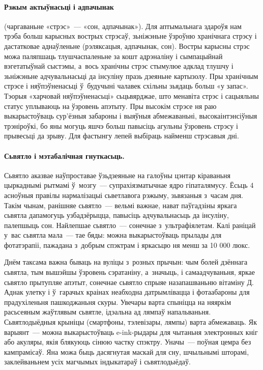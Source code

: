 \paragraph{Рэжым актыўнасьці і адпачынак} (чаргаваньне «стрэс»~--- «сон, адпачынак»).
Для аптымальнага здароўя нам трэба больш карысных вострых стрэсаў, зьніжэньне ўзроўню хранічнага стрэсу і дастатковае аднаўленьне (рэляксацыя, адпачынак, сон). Востры карысны стрэс можа паляпшаць тлушчаспаленьне за кошт адрэналіну і сымпацыйнай вэгетатыўнай сыстэмы, а~вось хранічны стрэс стымулюе адклад тлушчу і зьніжэньне адчувальнасьці да інсуліну празь дзеяньне картызолу. Пры хранічным стрэсе і няўпэўненасьці ў~будучыні чалавек схільны зьядаць больш «у запас». Тэорыя «харчовай няўпэўненасьці» сьцьвярджае, што менавіта стрэс і сацыяльны статус уплываюць на ўзровень апэтыту. Пры высокім стрэсе ня раю выкарыстоўваць сур'ёзныя забароны і выяўныя абмежаваньні, высокаінтэнсіўныя трэніроўкі, бо яны могуць яшчэ больш павысіць агульны ўзровень стрэсу і прывесьці да зрыву. Для фастынгу лепей выбіраць найменш стрэсавыя дні.

\paragraph{Сьвятло і мэтабалічная гнуткасьць.}
Сьвятло аказвае наўпроставае ўзьдзеяньне на галоўны цэнтар кіраваньня цыркаднымі рытмамі ў~мозгу~--- супрахіязматычнае ядро гіпаталямусу. Ёсьць 4 асноўныя правілы нармалізацыі сьветлавога рэжыму, зьвязаныя з~часам дня. Такім чынам, ранішняе сьвятло~--- вельмі важнае, нават паўгадзіны яркага сьвятла дапамогуць узбадзёрыцца, павысіць адчувальнасьць да інсуліну, палепшыць сон. Найлепшае сьвятло~--- сонечнае з~ультрафіялетам. Калі раніцай у~вас сьвятла мала~--- тае бяды: можна выкарыстоўваць прылады для фотатэрапіі, пажадана з~добрым спэктрам і яркасьцю ня менш за 10 000 люкс.

Днём таксама важна бываць на вуліцы з~розных прычын: чым болей дзённага сьвятла, тым вышэйшы ўзровень сэратаніну, а~значыць, і самаадчуваньня, яркае сьвятло прытупляе апэтыт, сонечнае сьвятло спрыяе назапашваньню вітаміну Д. Аднак улетку і ў~гарачых краінах неабходна датрымлівацца і фотаабароны для прадухіленьня пашкоджаньня скуры. Увечары варта спыніцца на няяркім расьсеяным жаўтлявым сьвятле, ідэальна ад лямпаў напальваньня. Сьвятлодыёдныя крыніцы (смартфоны, тэлевізары, лямпы) варта абмежаваць. Як варыянт~--- можна выкарыстоўваць e-ink-рыдары для чытаньня электронных кніг або акуляры, якія блякуюць сінюю частку спэктру. Уначы~--- поўная цемра без кампрамісаў. Яна можа быць дасягнутая маскай для сну, шчыльнымі шторамі, заклейваньнем усіх магчымых індыкатараў і сьвятлодыёдаў.

